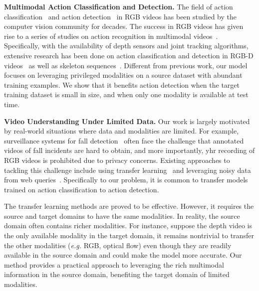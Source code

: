 \noindent\textbf{Multimodal Action Classification and Detection.}
The field of action classification~\cite{i3d_carreira,two_stream_simonyan,c3d_tran} and action detection~\cite{sst_buch_cvpr17,daps,thumos2015,structured_segment_network} in RGB videos has been studied by the computer vision community for decades. The success in RGB videos has given rise to a series of studies on action recognition in multimodal videos~\cite{hbrnn,jiang2014easy,koppula2013learning,li2018visual,cad,wang2012mining}. Specifically, with the availability of depth sensors and joint tracking algorithms, extensive research has been done on action classification and detection in RGB-D videos~\cite{ni2013rgbd,shahroudy2017deep,shao2017performance,yu2016structure} as well as skeleton sequences~\cite{10-stream,lstm_trust_gate,attention_lstm,skeleton_visualization,ntu_rgbd,geometric_features}. Different from previous work, our model focuses on leveraging privileged modalities on a source dataset with abundant training examples. We show that it benefits action detection when the target training dataset is small in size, and when only one modality is available at test time.

\noindent\textbf{Video Understanding Under Limited Data.}
Our work is largely motivated by real-world situations where data and modalities are limited. For example, surveillance systems for fall detection~\cite{fall_detection_principles,fall_detection_survey} often face the challenge that annotated videos of fall incidents are hard to obtain, and more importantly, yhr recording of RGB videos is prohibited due to privacy concerns. Existing approaches to tackling this challenge include using transfer learning~\cite{luo2017label,transfer_learning_survey} and leveraging noisy data from web queries~\cite{chen2015webly,liang2016learning,yeung2017learning}. Specifically to our problem, it is common to transfer models trained on action classification to action detection.

The transfer learning methods are proved to be effective. However, it requires the source and target domains to have the same modalities. In reality, the source domain often contains richer modalities. For instance, suppose the depth video is the only available modality in the target domain, it remains nontrivial to transfer the other modalities (\textit{e.g.} RGB, optical flow) even though they are readily available in the source domain and could make the model more accurate. Our method provides a practical approach to leveraging the rich multimodal information in the source domain, benefiting the target domain of limited modalities.

